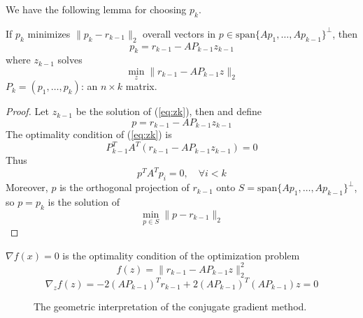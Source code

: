 We have the following lemma for choosing $p_k$.
\begin{lemma} \label{lemma:pk}
    If $p_k$ minimizes $\|p_k - r_{k-1}\|_2$ overall vectors in $p \in \mbox{span}\{Ap_1, \ldots, Ap_{k-1}\}^\perp$, then \begin{equation}
        p_k = r_{k-1} - A P_{k-1} z_{k-1} \label{eq:pk}
    \end{equation}
    where $z_{k-1}$ solves \begin{equation}
        \min_{z} \|r_{k-1} - A P_{k-1} z\|_2 \label{eq:zk}
    \end{equation}
    $P_{k} = (p_1, \ldots, p_{k})$: an $n \times k$ matrix.
\end{lemma}
\begin{proof}
    Let $z_{k-1}$ be the solution of (\ref{eq:zk}), then and define \[
        p = r_{k-1} - A P_{k-1} z_{k-1}
    \]
    The optimality condition of (\ref{eq:zk}) is \[
        P_{k-1}^T A^T (r_{k-1} - A P_{k-1} z_{k-1}) = 0
    \]
    Thus \[
        p^T A^T p_i = 0, \quad \forall i < k
    \]
    Moreover, $p$ is the orthogonal projection of $r_{k-1}$ onto $S = \mbox{span}\{Ap_1, \ldots, Ap_{k-1}\}^\perp$, so $p = p_k$ is the solution of \[
        \min_{p \in S} \|p - r_{k-1}\|_2
    \]
\end{proof}

\begin{note}
    $\nabla f (x) = 0$ is the optimality condition of the optimization problem \[
        f(z) = \|r_{k-1} - A P_{k-1} z\|_2^2
    \]
    $$\nabla_z f(z) = -2 (A P_{k-1})^T r_{k-1} + 2 (A P_{k-1})^T (A P_{k-1}) z = 0$$
\end{note}

\begin{figure}[H]
    \centering
    \caption{The geometric interpretation of the conjugate gradient method.}
\end{figure}


